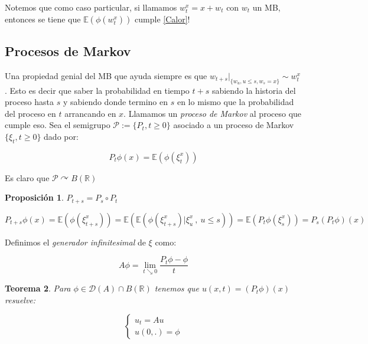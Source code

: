 \documentclass[11pt]{article}
\newcommand{\R}{{\mathbb{R}}}
\newtheorem{theorem}{Teorema}[section]
\newtheorem{proposition}[theorem]{Proposici\'on}
\newenvironment{proof}[1][Demostraci\'on]{\begin{trivlist}
\item[\hskip \labelsep {\bfseries #1}]}{\end{trivlist}}
\newcommand{\qed}{\nobreak \ifvmode \relax \else
      \ifdim\lastskip<1.5em \hskip-\lastskip
      \hskip1.5em plus0em minus0.5em \fi \nobreak
      \vrule height0.75em width0.5em depth0.25em\fi}
\begin{document}
Notemos que como caso particular, si llamamos $w_{t}^{x} = x + w_t $ con $w_t$ un MB, entonces se tiene que $\mathbb{E}({\phi(w_{t}^{x})})$ cumple \ref{Calor}!

\subsection{Procesos de Markov}

Una propiedad genial del MB que ayuda siempre es que $w_{t+s}|_{\{w_u,u \leq s,w_s=x\}} \sim w_{t}^{x}$. Esto es decir que saber la probabilidad en tiempo $t+s$ sabiendo la historia del proceso hasta $s$ y sabiendo donde termino en $s$ en lo mismo que la probabilidad del proceso en $t$ arrancando en $x$. Llamamos un \textit{proceso de Markov} al proceso que cumple eso. Sea el semigrupo $\mathcal{P}:=\{P_t , t\geq 0\}$ asociado a un proceso de Markov $\{\xi_t , t\geq 0\}$ dado por:

$$P_t \phi(x) = \mathbb{E}(\phi(\xi_{t}^{x}))$$

Es claro que $\mathcal{P} \curvearrowright B(\R)$

\begin{proposition}
$P_{t+s} = P_s \circ P_t$
\end{proposition}

\begin{proof}

$$P_{t+s}\phi (x) = \mathbb{E}(\phi(\xi_{t+s}^{x})) = \mathbb{E}(\mathbb{E}(\phi(\xi_{t+s}^{x})| \xi_{u}^{x} \ , \ u \leq s))=\mathbb{E}(P_t\phi(\xi_{s}^{x}))=P_s ( P_t \phi)(x)$$ \qed

\end{proof}

Definimos el \textit{generador infinitesimal} de $\xi$ como:

\begin{equation}
\label{generador}
{
A\phi = \lim_{t \searrow 0}{\dfrac{P_t\phi -\phi}{t}}
}
\end{equation}

\begin{theorem}

Para $\phi \in \mathcal{D}(A)\cap B(\R)$ tenemos que $u(x,t)=(P_t \phi)(x)$ resuelve:

\begin{equation}
\label{Ecuacion markov}
{
	\left\{
		\begin{array}{ll}
			u_t =  Au \\
			u(0,.) = \phi
		\end{array}
	\right.
}
\end{equation}

\end{theorem}
\end{document}
